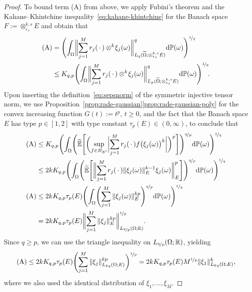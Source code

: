 \documentclass[reqno]{amsart}
\numberwithin{equation}{section}
\newcommand{\bbE}{\mathbb{E}}
\newcommand{\bbP}{\mathbb{P}}
\newcommand{\bbR}{\mathbb{R}}
\newcommand{\Omegat}{\widetilde{\Omega}}
\newcommand{\bbEt}{\widetilde{\bbE}}
\newcommand{\xk}{\otimes^k}
\newcommand{\xkseps}{\otimes^{k,s}_{\varepsilon_s}}
\newcommand{\norm}[2]{     \| #1       \|_{ #2 }}
\newcommand{\dual}[1]{{#1}^{\prime}}
\newcommand{\rd}{\mathrm{d}}
\theoremstyle{remark}
\theoremstyle{definition}
\begin{document}
\begin{proof}
	To bound term (A) from above, 
	we apply Fubini's theorem and 
	the Kahane--Khintchine inequality~\eqref{eq:kahane-khintchine} 
	for the Banach space $F:=\xkseps E$ 
	and obtain that 
	\begin{align*} 
	\text{(A)} 
	&=
	\Biggl( 
	\int_\Omega 
	\biggl\| 
	\sum_{j=1}^M 
	r_j (\,\cdot\,) 
	\xk\! \xi_j(\omega)  
	\biggr\|_{L_q(\Omegat;\xkseps E)}^q  
	\rd\bbP(\omega)
	\Biggr)^{\nicefrac{1}{q}} 
	\\
	&\leq 
	K_{q,p} 
	\Biggl( 
	\int_\Omega 
	\biggl\| 
	\sum_{j=1}^M 
	r_j (\,\cdot\,) 
	\xk\! \xi_j(\omega) 
	\biggr\|_{L_p(\Omegat;\xkseps E)}^q  
	\rd\bbP(\omega)
	\Biggr)^{\nicefrac{1}{q}} \!. 
	\end{align*} 
	Upon inserting the definition~\eqref{eq:sepsnorm}  
	of the symmetric injective tensor norm,  
	we use Proposition~\ref{prop:rade-gaussian}\ref{prop:rade-gaussian-poly}
	for the convex increasing function $G(t) := t^p$, $t\geq0$,
	and 
	the fact that the Banach space $E$ has type $p\in[1,2]$ 
	with type constant $\tau_p(E)\in(0,\infty)$, 
	to conclude that 
	{\allowdisplaybreaks
	\begin{align*} 
	\text{(A)} 
	&\leq 
	K_{q,p} 
	\Biggl( 
	\int_\Omega 
	\Biggl( 
	\bbEt 
	\Biggl[ 
	\biggl( 
	\sup_{f\in B_{\dual{E}}} 
	\biggl| 
	\sum_{j=1}^M 
	r_j (\,\cdot\,) 
	f\bigl( \xi_j(\omega) \bigr)^k 
	\biggr| \biggr)^p 
	\Biggr] 
	\Biggr)^{\nicefrac{q}{p}} 
	\rd\bbP(\omega)
	\Biggr)^{\nicefrac{1}{q}}  
	\\
	&\leq  
	2 k K_{q,p}  
	\Biggl( 
	\int_\Omega 
	\Biggl( 
	\bbEt 
	\Biggl[ 
	\biggl\| 
	\sum_{j=1}^M 
	r_j (\,\cdot\,) 
	\norm{ \xi_j(\omega) }{E}^{k-1} 
	\xi_j(\omega)
	\biggr\|_E^p 
	\Biggr] 
	\Biggr)^{\nicefrac{q}{p}} 
	\rd\bbP(\omega)
	\Biggr)^{\nicefrac{1}{q}} 
	\\
	\text{(A)} 
	&\leq 
	2 k K_{q,p} \tau_p(E) 
	\Biggl( 
	\int_\Omega 
	\Biggl( 
	\sum_{j=1}^M 
	\norm{ \xi_j(\omega) }{E}^{kp} 
	\Biggr)^{\nicefrac{q}{p}} 
	\rd\bbP(\omega)
	\Biggr)^{\nicefrac{1}{q}} 
	\\
	&= 
	2 k K_{q,p} \tau_p(E) 
	\biggl\| 
	\sum_{j=1}^M 
	\norm{\xi_j}{E}^{kp} 
	\biggr\|_{L_{\nicefrac{q}{p}}(\Omega;\bbR)}^{\nicefrac{1}{p}}. 
	\end{align*} 
	Since} $q\geq p$, 
	we can use the triangle inequality 
	on $L_{\nicefrac{q}{p}}(\Omega;\bbR)$, yielding 
	\begin{equation}\label{eq:proof:thm:MC-k:A} 
	\text{(A)} 
	\leq 
	2 k K_{q,p} \tau_p(E) 
	\Biggl(  
	\sum_{j=1}^M 
	\norm{\xi_j}{L_{kq}(\Omega;E)}^{kp} 
	\biggr)^{\nicefrac{1}{p}} 
	=  
	2 k K_{q,p} \tau_p(E) 
	M^{\nicefrac{1}{p}} 
	\norm{\xi_1}{L_{kq}(\Omega; E)}^k, 
	\end{equation} 
	where we also used the  
	identical distribution of $\xi_1,\ldots,\xi_M$. 
	

\end{proof}
\end{document}
